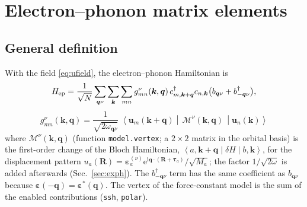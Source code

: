 \documentclass[11pt,a4paper]{article}
\newcommand{\ii}{\mathrm{i}}
\newcommand{\ee}{\mathrm{e}}
\newcommand{\kk}{\bm{k}}
\newcommand{\qq}{\bm{q}}
\newcommand{\RR}{\bm{R}}
\newcommand{\ttau}{\bm{\tau}}
\newcommand{\mel}[3]{\left\langle#1\middle|#2\middle|#3\right\rangle}
\newcommand{\code}[1]{\texttt{#1}}
\begin{document}
\section{Electron--phonon matrix elements}
\label{sec:eph}

\subsection{General definition}
With the field \eqref{eq:ufield}, the electron--phonon Hamiltonian is
\begin{equation}
H_{\rm ep}=\frac{1}{\sqrt N}\sum_{\qq\nu}\sum_{\kk}\sum_{mn}g^{\nu}_{mn}(\kk,\qq)\,c^\dagger_{m,\kk+\qq}c_{n,\kk}\big(b_{\qq\nu}+b^\dagger_{-\qq\nu}\big),
\end{equation}
\begin{equation}
\boxed{\;g^\nu_{mn}(\kk,\qq)=\frac{1}{\sqrt{2\omega_{\qq\nu}}}\;\mel{\bm u_m(\kk+\qq)}{\,\mathcal M^\nu(\kk,\qq)\,}{\bm u_n(\kk)}\;}
\label{eq:g}
\end{equation}
where $\mathcal M^\nu(\kk,\qq)$ (function \code{model.vertex}; a $2\times2$ matrix in the orbital basis) is the first-order change of the Bloch Hamiltonian, $\mel{a,\kk+\qq}{\delta H}{b,\kk}$, for the displacement pattern $u_a(\RR)=\bm\varepsilon^{(\nu)}_a\ee^{\ii\qq\cdot(\RR+\ttau_a)}/\sqrt{M_a}$; the factor $1/\sqrt{2\omega}$ is added afterwards (Sec.~\ref{sec:exph}). The $b^\dagger_{-\qq\nu}$ term has the same coefficient as $b_{\qq\nu}$ because $\bm\varepsilon(-\qq)=\bm\varepsilon^*(\qq)$. The vertex of the force-constant model is the sum of the enabled contributions (\code{ssh}, \code{polar}).
\end{document}
